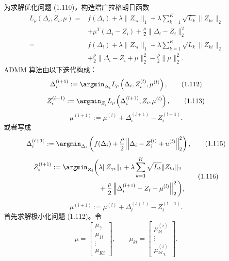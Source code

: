 为求解优化问题 (1.110)，构造增广拉格朗日函数
\begin{equation}
\begin{aligned}
L_\rho(\Delta_i,Z_i,\mu)
={}&f(\Delta_i)+\lambda\|Z_{\gamma i}\|_1
 +\lambda\sum_{k=1}^K\sqrt{L_k}\|Z_{ki}\|_2\\
&+\mu^T(\Delta_i-Z_i)+\frac{\rho}{2}\|\Delta_i-Z_i\|_2^2\\
={}&f(\Delta_i)+\lambda\|Z_{\gamma i}\|_1
 +\lambda\sum_{k=1}^K\sqrt{L_k}\|Z_{ki}\|_2\\
&+\frac{\rho}{2}\|\Delta_i-Z_i+\mu\|_2^2
 -\frac{\rho}{2}\|\mu\|_2^2.
\end{aligned}
\tag{1.111}
\end{equation}
ADMM 算法由以下迭代构成：
\begin{equation}
\Delta_i^{(l+1)}:=
\argmin_{\Delta_i}L_\rho\left(\Delta_i,Z_i^{(l)},\mu^{(l)}\right),
\tag{1.112}
\end{equation}
\begin{equation}
Z_i^{(l+1)}:=
\argmin_{Z_i}L_\rho\left(\Delta_i^{(l+1)},Z_i,\mu^{(l)}\right),
\tag{1.113}
\end{equation}
\begin{equation}
\mu^{(l+1)}:=\mu^{(l)}+\Delta_i^{(l+1)}-Z_i^{(l+1)}.
\tag{1.114}
\end{equation}
或者写成
\begin{equation}
\Delta_i^{(l+1)}:=
\argmin_{\Delta_i}
\left(f(\Delta_i)+\frac{\rho}{2}
\left\|\Delta_i-Z_i^{(l)}+u^{(l)}\right\|_2^2\right),
\tag{1.115}
\end{equation}
\begin{equation}
\begin{aligned}
Z_i^{(l+1)}:=\argmin_{Z_i}\bigg(&\lambda\|Z_{\gamma i}\|_1
 +\lambda\sum_{k=1}^K\sqrt{L_k}\|Z_{ki}\|_2\\
&+\frac{\rho}{2}
\left\|\Delta_i^{(l+1)}-Z_i+\mu^{(l)}\right\|_2^2\bigg),
\end{aligned}
\tag{1.116}
\end{equation}
\begin{equation}
\mu^{(l+1)}:=\mu^{(l)}+\Delta_i^{(l+1)}-Z_i^{(l+1)}.
\tag{1.117}
\end{equation}
首先求解极小化问题 (1.112)。令
\[
\mu=\begin{bmatrix}\mu_\gamma\\\mu_{1i}\\\vdots\\\mu_{Ki}\end{bmatrix},
\qquad
\mu_{ki}=\begin{bmatrix}\mu_{k1}^{(i)}\\\vdots\\\mu_{kL_k}^{(i)}\end{bmatrix}.
\]
